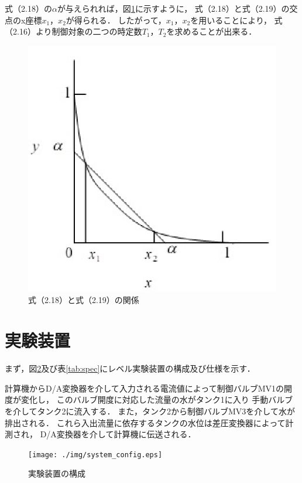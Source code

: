 \documentclass[11pt,a4paper]{jsarticle}
\begin{document}
  

  式（2.18）の$\alpha$が与えられれば，図\ref{fig:log}に示すように，
  式（2.18）と式（2.19）の交点のx座標$x_1$，$x_2$が得られる．
  したがって，$x_1$，$x_2$を用いることにより，
  式（2.16）より制御対象の二つの時定数$T_1$，$T_2$を求めることが出来る．\\

  \begin{figure}[h]
    \begin{center}
      \includegraphics[width=0.4\hsize]{./img/log_relation.eps}
    \end{center}
    \caption{式（2.18）と式（2.19）の関係}
    \label{fig:log}
  \end{figure}

\section{実験装置}
  \setcounter{equation}{0}
  \setcounter{figure}{0}
  \setcounter{table}{0}

  まず，図\ref{fig:config}及び表\ref{tab:spec}にレベル実験装置の構成及び仕様を示す．

  

  計算機からD/A変換器を介して入力される電流値によって制御バルブMV1の開度が変化し，
  このバルブ開度に対応した流量の水がタンク1に入り
  手動バルブを介してタンク2に流入する．
  また，タンク2から制御バルブMV3を介して水が排出される．
  これら入出流量に依存するタンクの水位は差圧変換器によって計測され，
  D/A変換器を介して計算機に伝送される．\\

  \begin{figure}[h]
    \begin{center}
      \texttt{[image: ./img/system\_config.eps]}
    \end{center}
    \caption{実験装置の構成}
    \label{fig:config}
  \end{figure}
\end{document}
